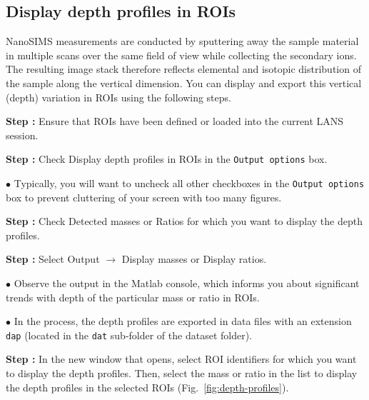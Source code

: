 \documentclass[a4paper, 11pt]{article}
\newcommand{\ttt}[1]{\texttt{#1}}
\newcommand{\lans}[1]{{\color{magenta}#1}}
\newcommand{\lanscb}[1]{{\color{darkgreen}#1}}
\newcommand\ra{\rightarrow}
\newcounter{step}
\newcommand\s{\addtocounter{step}{1}\vskip5pt\noindent\textbf{Step \thestep:}{ }}
\newcommand\bul{\vskip5pt\noindent$\bullet${ }}
\begin{document}
\subsection{Display depth profiles in ROIs}
\setcounter{step}{0}

NanoSIMS measurements are conducted by sputtering away the sample material in multiple scans over the same field of view while collecting the secondary ions. The resulting image stack therefore reflects elemental and isotopic distribution of the sample along the vertical dimension. You can display and export this vertical (depth) variation in ROIs using the following steps.

\s Ensure that ROIs have been defined or loaded into the current LANS session.

\s Check \lanscb{Display depth profiles in ROIs} in the \ttt{Output options} box.

\bul Typically, you will want to uncheck all other checkboxes in the \ttt{Output options} box to prevent cluttering of your screen with too many figures.

\s Check \lanscb{Detected masses} or \lanscb{Ratios} for which you want to display the depth profiles.

\s Select \lans{Output} $\ra$ \lans{Display masses} or \lans{Display ratios}.

\bul Observe the output in the Matlab console, which informs you about significant trends with depth of the particular mass or ratio in ROIs.

\bul In the process, the depth profiles are exported in data files with an extension \ttt{dap} (located in the \ttt{dat} sub-folder of the dataset folder).

\s In the new window that opens, select ROI identifiers for which you want to display the depth profiles. Then, select the mass or ratio in the list to display the depth profiles in the selected ROIs (Fig.~\ref{fig:depth-profiles}).
\end{document}
